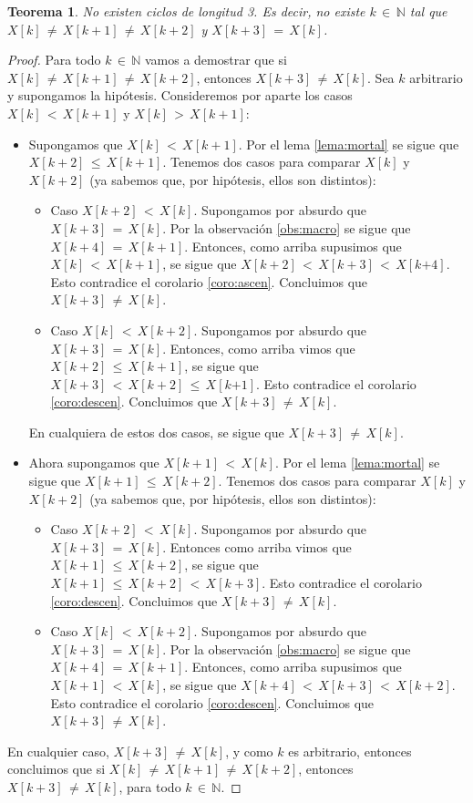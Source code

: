 \documentclass{article}
\newtheorem{teor}{Teorema}
\begin{document}
\begin{teor}
No existen ciclos de longitud 3. Es decir, no existe $k\,{\in}\,\mathbb{N}$ tal que $X[k]\,{\neq}\, X[k{+}1]\,{\neq}\, X[k{+}2]$ y $X[k{+}3]\,{=}\,X[k]$. 
\end{teor}
\begin{proof}
Para todo $k\,{\in}\,\mathbb{N}$ vamos a demostrar que si $X[k]\,{\neq}\, X[k{+}1]\,{\neq}\, X[k{+}2]$, entonces $X[k{+}3]\,{\neq}\,X[k]$. Sea $k$ arbitrario y supongamos la hipótesis. Consideremos por aparte los casos $X[k]\,{<}\, X[k{+}1]$ y $X[k]\,{>}\, X[k{+}1]$:
%
\begin{itemize}
\item Supongamos que $X[k]\,{<}\, X[k{+}1]$. Por el lema \ref{lema:mortal} se sigue que $X[k{+}2]\,{\leq}\, X[k{+}1]$. Tenemos dos casos para comparar $X[k]$ y $X[k{+}2]$ (ya sabemos que, por hipótesis, ellos son distintos):
	\begin{itemize}
	\item Caso $X[k{+}2]\,{<}\,X[k]$. Supongamos por absurdo que $X[k{+}3]\,{=}\,X[k]$. Por la observación \ref{obs:macro} se sigue que $X[k{+}4]\,{=}\,X[k{+}1]$. Entonces, como arriba supusimos que $X[k]\,{<}\, X[k{+}1]$, se sigue que $X[k{+}2]\,{<}\,X[k{+}3]\,{<}\,X[k{+4}]$. Esto contradice el corolario \ref{coro:ascen}. Concluimos que $X[k{+}3]\,{\neq}\,X[k]$.
	\item Caso $X[k]\,{<}\,X[k{+}2]$. Supongamos por absurdo que $X[k{+}3]\,{=}\,X[k]$. Entonces, como arriba vimos que $X[k{+}2]\,{\leq}\, X[k{+}1]$, se sigue que $X[k{+}3]\,{<}\,X[k{+}2]\,{\leq}\,X[k{+1}]$. Esto contradice el corolario \ref{coro:descen}. Concluimos que $X[k{+}3]\,{\neq}\,X[k]$.
	\end{itemize}
	En cualquiera de estos dos casos, se sigue que $X[k{+}3]\,{\neq}\,X[k]$.
	
\item Ahora supongamos que $X[k{+}1]\,{<}\, X[k]$. Por el lema \ref{lema:mortal} se sigue que $X[k{+}1]\,{\leq}\, X[k{+}2]$. Tenemos dos casos para comparar $X[k]$ y $X[k{+}2]$ (ya sabemos que, por hipótesis, ellos son distintos):
    \begin{itemize}
        \item Caso $X[k{+}2]\,{<}\,X[k]$. Supongamos por absurdo que $X[k{+}3]\,{=}\,X[k]$. Entonces como arriba vimos que $X[k{+}1]\,{\leq}\, X[k{+}2]$, se sigue que $X[k{+}1]\,{\leq}\,X[k{+}2]\,{<}\,X[k{+}3]$. Esto contradice el corolario \ref{coro:descen}. Concluimos que $X[k{+}3]\,{\neq}\,X[k]$.
        \item Caso $X[k]\,{<}\,X[k{+}2]$. Supongamos por absurdo que $X[k{+}3]\,{=}\,X[k]$. Por la observación \ref{obs:macro} se sigue que $X[k{+}4]\,{=}\,X[k{+}1]$. Entonces, como arriba supusimos que $X[k+1]\,{<}\, X[k]$, se sigue que $X[k{+}4]\,{<}\,X[k{+}3]\,{<}\,X[k{+}2]$. Esto contradice el corolario \ref{coro:descen}. Concluimos que $X[k{+}3]\,{\neq}\,X[k]$.
    \end{itemize}
\end{itemize}
En cualquier caso, $X[k{+}3]\,{\neq}\,X[k]$, y como $k$ es arbitrario, entonces concluimos que si $X[k]\,{\neq}\, X[k{+}1]\,{\neq}\, X[k{+}2]$, entonces $X[k{+}3]\,{\neq}\,X[k]$, para todo $k\,{\in}\,\mathbb{N}$.
\end{proof}
\end{document}

